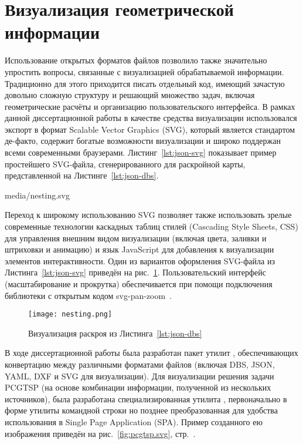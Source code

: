 
\section{
  Визуализация геометрической информации
}
\label{sec:json.view}

Использование открытых форматов файлов позволило
также значительно упростить вопросы,
связанные с визуализацией обрабатываемой информации.
Традиционно для этого приходится
писать отдельный код,
имеющий зачастую довольно сложную структуру и решающий
множество задач, включая геометрические расчёты
и организацию пользовательского интерфейса.
В рамках данной диссертационной работы
в качестве средства визуализации
использовался экспорт в формат
Scalable Vector Graphics
(SVG),
который является стандартом де-факто,
содержит богатые возможности визуализации
и широко поддержан всеми современными браузерами.
Листинг~\ref{lst:json-svg}
показывает пример простейшего SVG-файла,
сгенерированного для раскройной карты,
представленной на Листинге~\ref{lst:json-dbs}.


  {media/nesting.svg}

Переход к широкому использованию SVG
позволяет также использовать зрелые современные технологии
каскадных таблиц стилей
(Cascading Style Sheets, CSS)
для управления внешним видом визуализации
(включая цвета, заливки и штриховки и анимацию)
и язык JavaScript
для добавления к визуализации
элементов интерактивности.
Один из вариантов оформления
SVG-файла из Листинга~\ref{lst:json-svg}
приведён на рис.~\ref{fig:json-nesting}.
Пользовательский интерфейс
(масштабирование и прокрутка)
обеспечивается при помощи подключения
библиотеки с открытым кодом
svg-pan-zoom~\cite{bi:svg-pan-zoom}.

\begin{figure}
  \centering
  \texttt{[image: nesting.png]}
  \caption{Визуализация раскроя из Листинга~\ref{lst:json-dbs}}
  \label{fig:json-nesting}
\end{figure}

В ходе диссертационной работы
была разработан пакет утилит
\cite{bi:dbs2json},
обеспечивающих конвертацию между
различными форматами файлов
(включая DBS, JSON, YAML, DXF и SVG для визуализации).
Для визуализации решения задачи PCGTSP
(на основе комбинации информации,
полученной из нескольких источников),
была разработана специализированная утилита
\cite{bi:j2pcgtsp},
первоначально в форме утилиты командной строки
но позднее преобразованная
для удобства использования в
Single Page Application
(SPA).
Пример созданного ею изображения
приведён на рис.~\ref{fig:pcgtsp.svg},
стр.~\pageref{fig:pcgtsp.svg}.
